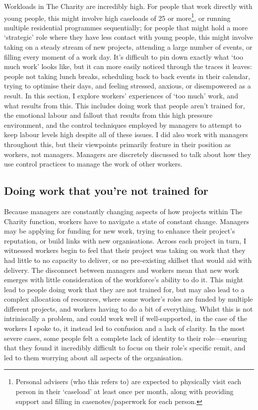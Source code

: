 Workloads in The Charity are incredibly high. For people that work directly with young people, this might involve high caseloads of 25 or more\footnote{Personal advisers (who this refers to) are expected to physically visit each person in their `caseload' at least once per month, along with providing support and filling in casenotes/paperwork for each person. }, or running multiple residential programmes sequentially; for people that might hold a more ‘strategic’ role where they have less contact with young people, this might involve taking on a steady stream of new projects, attending a large number of events, or filling every moment of a work day. It’s difficult to pin down exactly  what ‘too much work’ looks like, but it can more easily noticed through the traces it leaves: people not taking lunch breaks, scheduling back to back events in their calendar, trying to optimise their days, and feeling stressed, anxious, or disempowered as a result. In this section, I explore workers' experiences of `too much' work, and what results from this. This includes doing work that people aren’t trained for, the emotional labour and fallout that results from this high pressure environment, and the control techniques employed by managers to attempt to keep labour levels high despite all of these issues. I did also work with managers throughout this, but their viewpoints primarily feature in their position as workers, not managers. Managers are discretely discussed to talk about how they use control practices to manage the work of other workers.

\subsection{Doing work that you’re not trained for}
Because managers are constantly changing aspects of how projects within The Charity function, workers have to navigate a state of constant change. Managers may be applying for funding for new work, trying to enhance their project’s reputation, or build links with new organisations. Across each project in turn, I witnessed workers begin to feel that their project was taking on work that they had little to no capacity to deliver, or no pre-existing skillset that would aid with delivery. The disconnect between managers and workers mean that new work emerges with little consideration of the workforce's ability to do it. This might lead to people doing work that they are not trained for, but may also lead to a complex allocation of resources, where some worker's roles are funded by multiple different projects, and workers having to do a bit of everything. Whilst this is not intriniscally a problem, and could work well if well-supported, in the case of the workers I spoke to, it instead led to confusion and a lack of clarity. In the most severe cases,  some people felt a complete lack of identity to their role—ensuring that they found it incredibly difficult to focus on their role's specific remit, and led to them worrying about all aspects of the organisation.

